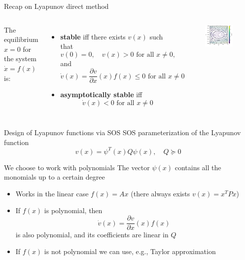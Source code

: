 \documentclass[aspectratio=169]{beamer}
\begin{document}
\begin{frame}{Recap on Lyapunov direct method}
\begin{columns}
The equilibrium $x=0$ for the system $\dot x = f(x)$ is:
\begin{itemize}
\item
\textbf{stable} iff there exists $v(x)$ such that
$$
v(0) = 0, \quad v(x) > 0 \text{ for all } x \neq 0,
$$
and
$$
\dot v(x) = \frac{\partial v}{\partial x}(x) f(x) \leq 0 \text{ for all }  x \neq 0
$$
\item<2->
\textbf{asymptotically stable} iff
$$
\dot v(x) < 0 \text{ for all }  x \neq 0
$$
\end{itemize}
\begin{figure}
\includegraphics[width=\columnwidth]{figures/lyapunov_poly.pdf}
\end{figure}
\end{columns}
\end{frame}


\begin{frame}{Design of Lyapunov functions via SOS}
SOS parameterization of the Lyapunov function
$$
v(x) = \psi^T(x) Q \psi(x), \quad Q \succeq 0
$$
\pause
\vspace{-5mm}
\begin{block}{We choose to work with polynomials}
The vector $\psi(x)$ contains all the monomials up to a certain degree
\pause
\begin{itemize}
\item
Works in the linear case $f(x) = A x$ (there always exists $v(x) = x^T P x$)
\pause
\item
If $f(x)$ is polynomial, then
$$
\dot v(x) = \frac{\partial v}{\partial x}(x) f(x)
$$
is also polynomial, and its coefficients are linear in $Q$
\pause
\item
If $f(x)$ is not polynomial we can use, e.g., Taylor approximation
\end{itemize}
\end{block}
\end{frame}
\end{document}
